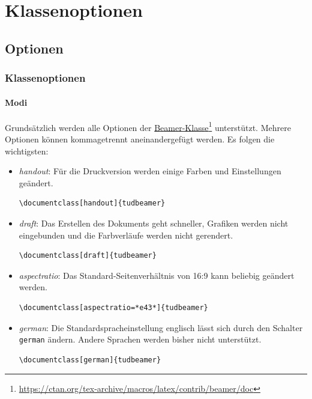 \documentclass[german,notoc]{tudbeamer}%
\begin{document}
\section{Klassenoptionen}
\subsection{Optionen}
\begin{frame}[fragile]
	\frametitle{Klassenoptionen}
	\framesubtitle{Modi}

	Grundsätzlich werden alle Optionen der \href{https://ctan.org/tex-archive/macros/latex/contrib/beamer/doc}{		Beamer-Klasse}\footnote{\href{https://ctan.org/tex-archive/macros/latex/contrib/beamer/doc}{
				\url{https://ctan.org/tex-archive/macros/latex/contrib/beamer/doc}}}	
	unterstützt. Mehrere Optionen können kommagetrennt aneinandergefügt werden. Es folgen die wichtigsten:
	\begin{itemize}
		\item \emph{handout}: Für die Druckversion werden einige Farben und Einstellungen geändert.
			\begin{lstlisting}[gobble=8,style=latex,numbers=none]
				\documentclass[handout]{tudbeamer}
			\end{lstlisting}
		\item \emph{draft}: Das Erstellen des Dokuments geht schneller, Grafiken werden nicht eingebunden und die Farbverläufe werden nicht gerendert.
			\begin{lstlisting}[gobble=8,style=latex,numbers=none]
				\documentclass[draft]{tudbeamer}
			\end{lstlisting}
		\item \emph{aspectratio}: Das Standard-Seitenverhältnis von 16:9 kann beliebig geändert werden.
			\begin{lstlisting}[gobble=8,style=latex,numbers=none]
				\documentclass[aspectratio=*e43*]{tudbeamer}
			\end{lstlisting} 
		\item \emph{german}: Die Standardspracheinstellung englisch lässt sich durch den Schalter \texttt{german} ändern. Andere Sprachen werden bisher nicht unterstützt.
			\begin{lstlisting}[gobble=8,style=latex,numbers=none]
				\documentclass[german]{tudbeamer}
			\end{lstlisting} 
	\end{itemize}
\end{frame}
\end{document}
